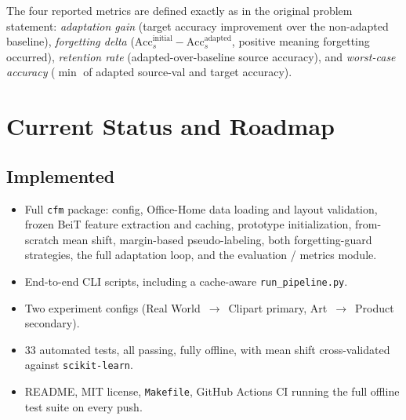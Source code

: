 \documentclass[11pt]{article}
\begin{document}
The four reported metrics are defined exactly as in the original problem statement:
\emph{adaptation gain} (target accuracy improvement over the non-adapted baseline),
\emph{forgetting delta} ($\mathrm{Acc}_s^{\mathrm{initial}} - \mathrm{Acc}_s^{\mathrm{adapted}}$,
positive meaning forgetting occurred), \emph{retention rate} (adapted-over-baseline source
accuracy), and \emph{worst-case accuracy} ($\min$ of adapted source-val and target accuracy).

\section{Current Status and Roadmap}

\subsection*{Implemented}
\begin{itemize}[leftmargin=1.4em]
\item Full \texttt{cfm} package: config, Office-Home data loading and layout validation, frozen
BeiT feature extraction and caching, prototype initialization, from-scratch mean shift, margin-based
pseudo-labeling, both forgetting-guard strategies, the full adaptation loop, and the evaluation /
metrics module.
\item End-to-end CLI scripts, including a cache-aware \texttt{run\_pipeline.py}.
\item Two experiment configs (Real World~$\to$~Clipart primary, Art~$\to$~Product secondary).
\item 33 automated tests, all passing, fully offline, with mean shift cross-validated against
\texttt{scikit-learn}.
\item README, MIT license, \texttt{Makefile}, GitHub Actions CI running the full offline test
suite on every push.
\end{itemize}
\end{document}
